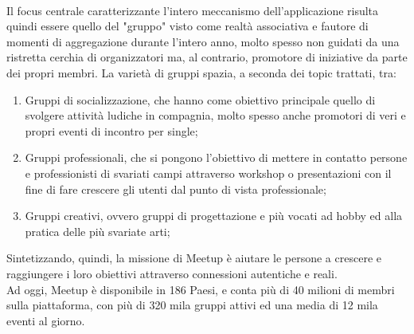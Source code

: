 \documentclass[fleqn,10pt]{SelfArx} %
\begin{document}
{\\
Il focus centrale caratterizzante l'intero meccanismo dell'applicazione risulta quindi essere quello del "gruppo" visto come realtà associativa e fautore di momenti di aggregazione durante l'intero anno, molto spesso non guidati da una ristretta cerchia di organizzatori ma, al contrario, promotore di iniziative da parte dei propri membri. 
La varietà di gruppi spazia, a seconda dei topic trattati, tra:
\begin{enumerate}
\item Gruppi di socializzazione, che hanno come obiettivo principale quello di svolgere attività ludiche in compagnia, molto spesso anche promotori di veri e propri eventi di incontro per single;
\item Gruppi professionali, che si pongono l'obiettivo di mettere in contatto persone e professionisti di svariati campi attraverso workshop o presentazioni con il fine di fare crescere gli utenti dal punto di vista professionale;
\item Gruppi creativi, ovvero gruppi di progettazione e più vocati ad hobby ed alla pratica delle più svariate arti; \\
\end{enumerate}
Sintetizzando, quindi, la missione di Meetup è aiutare le persone a crescere e raggiungere i loro obiettivi attraverso connessioni autentiche e reali. \\
Ad oggi, Meetup è disponibile in 186 Paesi, e conta più di 40 milioni di membri sulla piattaforma, con più di 320 mila gruppi attivi ed una media di 12 mila eventi al giorno.
}
\end{document}
